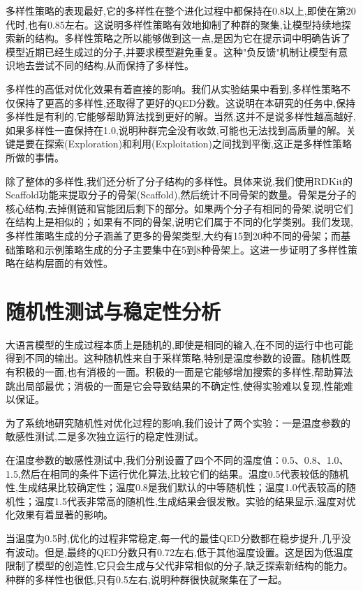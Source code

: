 多样性策略的表现最好,它的多样性在整个进化过程中都保持在0.8以上,即使在第20代时,也有0.85左右。这说明多样性策略有效地抑制了种群的聚集,让模型持续地探索新的结构。多样性策略之所以能够做到这一点,是因为它在提示词中明确告诉了模型近期已经生成过的分子,并要求模型避免重复。这种"负反馈"机制让模型有意识地去尝试不同的结构,从而保持了多样性。

多样性的高低对优化效果有着直接的影响。我们从实验结果中看到,多样性策略不仅保持了更高的多样性,还取得了更好的QED分数。这说明在本研究的任务中,保持多样性是有利的,它能够帮助算法找到更好的解。当然,这并不是说多样性越高越好,如果多样性一直保持在1.0,说明种群完全没有收敛,可能也无法找到高质量的解。关键是要在探索(Exploration)和利用(Exploitation)之间找到平衡,这正是多样性策略所做的事情。

除了整体的多样性,我们还分析了分子结构的多样性。具体来说,我们使用RDKit的Scaffold功能来提取分子的骨架(Scaffold),然后统计不同骨架的数量。骨架是分子的核心结构,去掉侧链和官能团后剩下的部分。如果两个分子有相同的骨架,说明它们在结构上是相似的；如果有不同的骨架,说明它们属于不同的化学类别。我们发现,多样性策略生成的分子涵盖了更多的骨架类型,大约有15到20种不同的骨架；而基础策略和示例策略生成的分子主要集中在5到8种骨架上。这进一步证明了多样性策略在结构层面的有效性。

\section{随机性测试与稳定性分析}

大语言模型的生成过程本质上是随机的,即使是相同的输入,在不同的运行中也可能得到不同的输出。这种随机性来自于采样策略,特别是温度参数的设置。随机性既有积极的一面,也有消极的一面。积极的一面是它能够增加搜索的多样性,帮助算法跳出局部最优；消极的一面是它会导致结果的不确定性,使得实验难以复现,性能难以保证。

为了系统地研究随机性对优化过程的影响,我们设计了两个实验：一是温度参数的敏感性测试,二是多次独立运行的稳定性测试。

在温度参数的敏感性测试中,我们分别设置了四个不同的温度值：0.5、0.8、1.0、1.5,然后在相同的条件下运行优化算法,比较它们的结果。温度0.5代表较低的随机性,生成结果比较确定性；温度0.8是我们默认的中等随机性；温度1.0代表较高的随机性；温度1.5代表非常高的随机性,生成结果会很发散。实验的结果显示,温度对优化效果有着显著的影响。

当温度为0.5时,优化的过程非常稳定,每一代的最佳QED分数都在稳步提升,几乎没有波动。但是,最终的QED分数只有0.72左右,低于其他温度设置。这是因为低温度限制了模型的创造性,它只会生成与父代非常相似的分子,缺乏探索新结构的能力。种群的多样性也很低,只有0.5左右,说明种群很快就聚集在了一起。

